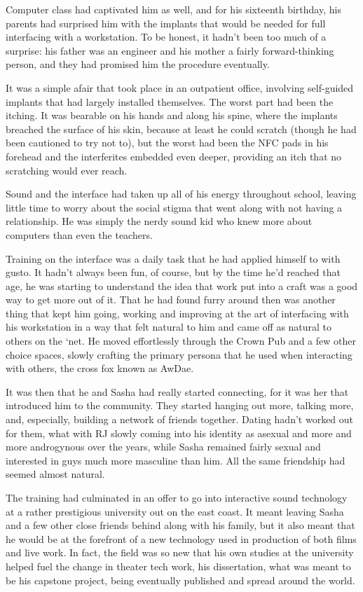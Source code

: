 Computer class had captivated him as well, and for his sixteenth birthday, his parents had surprised him with the implants that would be needed for full interfacing with a workstation.  To be honest, it hadn't been too much of a surprise: his father was an engineer and his mother a fairly forward-thinking person, and they had promised him the procedure eventually.

It was a simple afair that took place in an outpatient office, involving self-guided implants that had largely installed themselves.  The worst part had been the itching.  It was bearable on his hands and along his spine, where the implants breached the surface of his skin, because at least he could scratch (though he had been cautioned to try not to), but the worst had been the NFC pads in his forehead and the interferites embedded even deeper, providing an itch that no scratching would ever reach.

Sound and the interface had taken up all of his energy throughout school, leaving little time to worry about the social stigma that went along with not having a relationship.  He was simply the nerdy sound kid who knew more about computers than even the teachers.

Training on the interface was a daily task that he had applied himself to with gusto.  It hadn't always been fun, of course, but by the time he'd reached that age, he was starting to understand the idea that work put into a craft was a good way to get more out of it.  That he had found furry around then was another thing that kept him going, working and improving at the art of interfacing with his workstation in a way that felt natural to him and came off as natural to others on the `net.  He moved effortlessly through the Crown Pub and a few other choice spaces, slowly crafting the primary persona that he used when interacting with others, the cross fox known as AwDae.

It was then that he and Sasha had really started connecting, for it was her that introduced him to the community.  They started hanging out more, talking more, and, especially, building a network of friends together.  Dating hadn't worked out for them, what with RJ slowly coming into his identity as asexual and more and more androgynous over the years, while Sasha remained fairly sexual and interested in guys much more masculine than him.  All the same friendship had seemed almost natural.

The training had culminated in an offer to go into interactive sound technology at a rather prestigious university out on the east coast.  It meant leaving Sasha and a few other close friends behind along with his family, but it also meant that he would be at the forefront of a new technology used in production of both films and live work.  In fact, the field was so new that his own studies at the university helped fuel the change in theater tech work, his dissertation, what was meant to be his capstone project, being eventually published and spread around the world.


